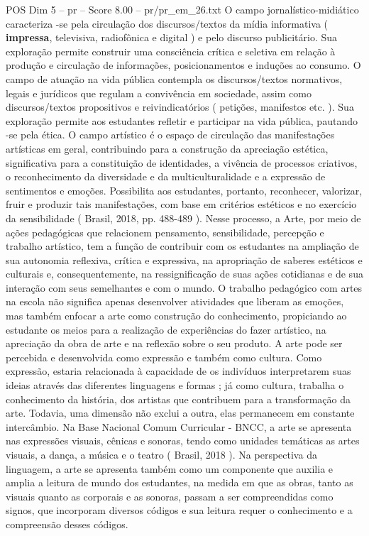 \begin{textsample}{POS Dim 5 – pr – Score 8.00 – pr/pr\_em\_26.txt}
O campo jornalístico-midiático caracteriza -se pela circulação dos discursos/textos da mídia informativa ( \textbf{impressa}, televisiva, radiofônica e digital ) e pelo discurso publicitário.
Sua exploração permite construir uma consciência crítica e seletiva em relação à produção e circulação de informações, posicionamentos e induções ao consumo.
O campo de atuação na vida pública contempla os discursos/textos normativos, legais e jurídicos que regulam a convivência em sociedade, assim como discursos/textos propositivos e reivindicatórios ( petições, manifestos etc. ).
Sua exploração permite aos estudantes refletir e participar na vida pública, pautando -se pela ética.
O campo artístico é o espaço de circulação das manifestações artísticas em geral, contribuindo para a construção da apreciação estética, significativa para a constituição de identidades, a vivência de processos criativos, o reconhecimento da diversidade e da multiculturalidade e a expressão de sentimentos e emoções.
Possibilita aos estudantes, portanto, reconhecer, valorizar, fruir e produzir tais manifestações, com base em critérios estéticos e no exercício da sensibilidade ( Brasil, 2018, pp. 488-489 ).
Nesse processo, a Arte, por meio de ações pedagógicas que relacionem pensamento, sensibilidade, percepção e trabalho artístico, tem a função de contribuir com os estudantes na ampliação de sua autonomia reflexiva, crítica e expressiva, na apropriação de saberes estéticos e culturais e, consequentemente, na ressignificação de suas ações cotidianas e de sua interação com seus semelhantes e com o mundo.
O trabalho pedagógico com artes na escola não significa apenas desenvolver atividades que liberam as emoções, mas também enfocar a arte como construção do conhecimento, propiciando ao estudante os meios para a realização de experiências do fazer artístico, na apreciação da obra de arte e na reflexão sobre o seu produto.
A arte pode ser percebida e desenvolvida como expressão e também como cultura.
Como expressão, estaria relacionada à capacidade de os indivíduos interpretarem suas ideias através das diferentes linguagens e formas ; já como cultura, trabalha o conhecimento da história, dos artistas que contribuem para a transformação da arte.
Todavia, uma dimensão não exclui a outra, elas permanecem em constante intercâmbio.
Na Base Nacional Comum Curricular - BNCC, a arte se apresenta nas expressões visuais, cênicas e sonoras, tendo como unidades temáticas as artes visuais, a dança, a música e o teatro ( Brasil, 2018 ).
Na perspectiva da linguagem, a arte se apresenta também como um componente que auxilia e amplia a leitura de mundo dos estudantes, na medida em que as obras, tanto as visuais quanto as corporais e as sonoras, passam a ser compreendidas como signos, que incorporam diversos códigos e sua leitura requer o conhecimento e a compreensão desses códigos.

\end{textsample}
